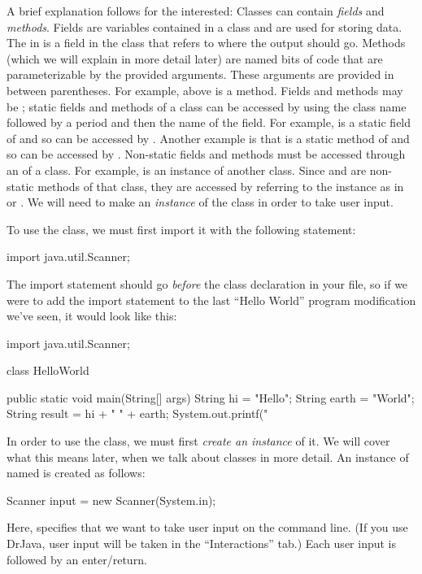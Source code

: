 A brief explanation follows for the interested:
Classes can contain \emph{fields} and \emph{methods}.
Fields are variables contained in a class and are used
for storing data. The  in  is
a field in the  class
that refers to where the output should go.
Methods (which we will explain in more detail later) are named bits of code
that are parameterizable by the provided arguments. These
arguments are provided in between parentheses.
For example,  above is a method.
Fields and methods may be ; static fields and methods
of a class can be accessed by using the class name followed
by a period and then the name of the field. For example,
 is a static field of  and 
so can be accessed by .
Another example is that  is a static method
of  and so can be accessed by .
Non-static fields and methods must be accessed
through an  of a class. For example,
 is an instance of another class.
Since  and  are non-static methods
of that class, they are accessed
by referring to the instance  as in
 or .
We will need to make an \emph{instance} of the
 class in order to take user input.

To use the  class, we must first import it
with the following statement:
\begin{code}
import java.util.Scanner;
\end{code}
The import statement should go \emph{before} the class declaration in your file, so
if we were to add the import statement to the last ``Hello World'' program modification
we've seen, it would look like this:

\begin{code}
import java.util.Scanner;

class HelloWorld {

    public static void main(String[] args) {
        String hi = "Hello";
        String earth = "World";
        String result = hi + " " + earth;
        System.out.printf("%
    }

}
\end{code}

In order to use the  class, we must first \emph{create an instance} of it.
We will cover what this means later, when we talk about classes in more detail.
An instance of  named  is created as follows:
\begin{code}
Scanner input = new Scanner(System.in);
\end{code}
Here,  specifies that we want to take user input
on the command line. (If you use DrJava, user input will be taken
in the ``Interactions'' tab.) Each user input is followed by an enter/return.

